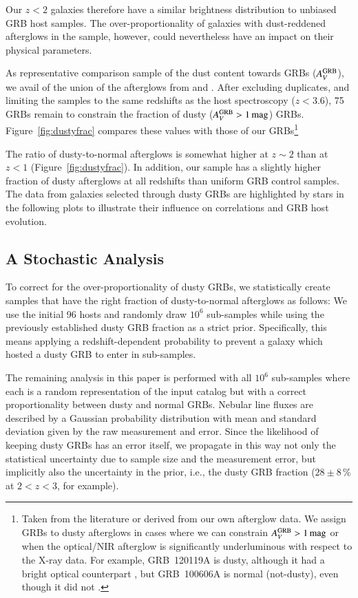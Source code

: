 \documentclass[traditabstract, longauth]{aa}
\begin{document}
{Our $z<2$ galaxies therefore have a similar brightness distribution to unbiased GRB host samples. The over-proportionality of galaxies with dust-reddened afterglows in the sample, however, could nevertheless have an impact on their physical parameters.}

 {As representative comparison sample of the dust content towards GRBs ($A^{\rm{GRB}}_V$), we avail of the union of the afterglows from \citet{2011A&A...526A..30G} and \citet{2013MNRAS.432.1231C}. After excluding duplicates, and limiting the samples to the same redshifts as the host spectroscopy ($z<3.6$), 75 GRBs remain to constrain the fraction of dusty ($A^{\rm{GRB}}_V>1\,\rm{mag}$) GRBs.} {Figure~\ref{fig:dustyfrac} compares these values with those of our GRBs\footnote{Taken from the literature \citep{2009ApJ...693.1484C, 2011A&A...534A.108K, 2011A&A...532A.143Z, 2015arXiv150402482P} or derived from our own afterglow data. We assign GRBs to dusty afterglows in cases where we can constrain $A^{\rm{GRB}}_V>1\,\rm{mag}$ or when the optical/NIR afterglow is significantly underluminous with respect to the X-ray data. For example, GRB~120119A is dusty, although it had a bright optical counterpart \citep{2014MNRAS.440.1810M}, but GRB~100606A is normal (not-dusty), even though it did not \citep{2010GCN..10835...1N}.}} 

 {The ratio of dusty-to-normal afterglows is somewhat higher at $z\sim2$ than at $z<1$ (Figure~\ref{fig:dustyfrac}). In addition, our sample has a slightly higher fraction of dusty afterglows at all redshifts than uniform GRB control samples. The data from galaxies selected through dusty GRBs are highlighted by stars in the following plots to illustrate their influence on correlations and GRB host evolution.}

\subsection{A Stochastic Analysis}
\label{sec:statana}

 {To correct for the over-proportionality of dusty GRBs, we statistically create samples that have the right fraction of dusty-to-normal afterglows as follows: We use the initial 96 hosts and randomly draw $10^6$ sub-samples while using the previously established dusty GRB fraction as a strict prior. Specifically, this means applying a redshift-dependent probability to prevent a galaxy which hosted a dusty GRB to enter in sub-samples.}
 
 {The remaining analysis in this paper is performed with all $10^{6}$ sub-samples where each is a random representation of the input catalog but with a correct proportionality between dusty and normal GRBs. Nebular line fluxes are described by a Gaussian probability distribution with mean and standard deviation given by the raw measurement and error. Since the likelihood of keeping dusty GRBs has an error itself, we propagate in this way not only the statistical uncertainty due to sample size and the measurement error, but implicitly also the uncertainty in the prior, i.e., the dusty GRB fraction ($28\pm8\,\%$ at $2<z<3$, for example).}
\end{document}
